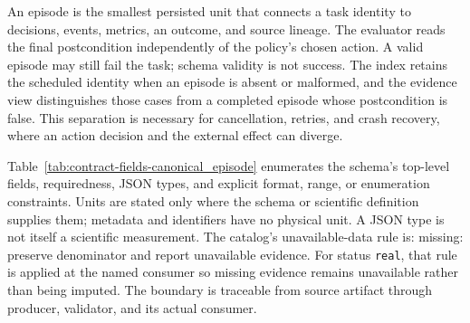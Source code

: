 An episode is the smallest persisted unit that connects a task identity to decisions, events, metrics, an outcome, and source lineage. The evaluator reads the final postcondition independently of the policy's chosen action. A valid episode may still fail the task; schema validity is not success. The index retains the scheduled identity when an episode is absent or malformed, and the evidence view distinguishes those cases from a completed episode whose postcondition is false. This separation is necessary for cancellation, retries, and crash recovery, where an action decision and the external effect can diverge.

Table~\ref{tab:contract-fields-canonical_episode} enumerates the schema's top-level fields, requiredness, JSON types, and explicit format, range, or enumeration constraints. Units are stated only where the schema or scientific definition supplies them; metadata and identifiers have no physical unit. A JSON type is not itself a scientific measurement. The catalog's unavailable-data rule is: missing: preserve denominator and report unavailable evidence. For status \texttt{real}, that rule is applied at the named consumer so missing evidence remains unavailable rather than being imputed. The boundary is traceable from source artifact through producer, validator, and its actual consumer.

